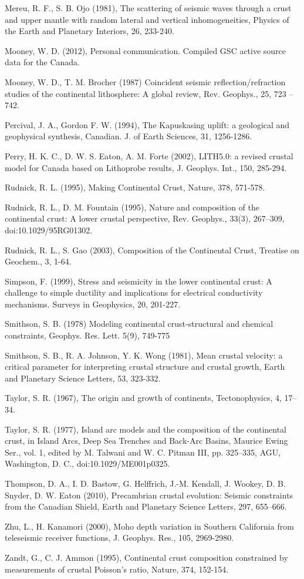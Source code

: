 \documentclass[draft, 12pt]{article}
\begin{document}
Mereu, R. F., S. B. Ojo (1981), The scattering of seismic waves through a crust and upper mantle with random lateral and vertical inhomogeneities, Physics of the Earth and Planetary Interiors, 26, 233-240.

Mooney, W. D. (2012), Personal communication. Compiled GSC active source data for the Canada.

Mooney, W. D., T. M. Brocher (1987) Coincident seismic reflection/refraction studies of the continental lithosphere: A global review, Rev. Geophys., 25, 723 – 742.

Percival, J. A., Gordon F. W. (1994), The Kapuskasing uplift: a geological and geophysical synthesis, Canadian. J. of Earth Sciences, 31, 1256-1286.

Perry, H. K. C., D. W. S. Eaton, A. M. Forte (2002), LITH5.0: a revised crustal model for Canada based on Lithoprobe results,  J. Geophys. Int., 150, 285-294.

Rudnick, R. L. (1995), Making Continental Crust, Nature, 378, 571-578.

Rudnick, R. L., D. M. Fountain (1995), Nature and composition of the continental crust: A lower crustal perspective, Rev. Geophys., 33(3), 267–309, doi:10.1029/95RG01302.

Rudnick, R. L., S. Gao (2003), Composition of the Continental Crust, Treatise on Geochem., 3, 1-64.

Simpson, F. (1999), Stress and seismicity in the lower continental crust: A challenge to simple ductility and implications for electrical conductivity mechanisms. Surveys in Geophysics, 20, 201-227.

Smithson, S. B. (1978) Modeling continental crust-structural and chemical constraints, Geophys. Res. Lett. 5(9), 749-775

Smithson, S. B., R. A. Johnson, Y. K. Wong (1981), Mean crustal velocity: a critical parameter for interpreting crustal structure and crustal growth, Earth and Planetary Science Letters, 53, 323-332.

Taylor, S. R. (1967), The origin and growth of continents, Tectonophysics, 4, 17–34.

Taylor, S. R. (1977), Island arc models and the composition of the continental crust, in Island Arcs, Deep Sea Trenches and Back-Arc Basins, Maurice Ewing Ser., vol. 1, edited by M. Talwani and W. C. Pitman III, pp. 325–335, AGU, Washington, D. C., doi:10.1029/ME001p0325.

Thompson, D. A., I. D. Bastow, G. Helffrich, J.-M. Kendall, J. Wookey, D. B. Snyder, D. W. Eaton (2010), Precambrian crustal evolution: Seismic constraints from the Canadian Shield, Earth and Planetary Science Letters, 297, 655–666.

Zhu, L., H. Kanamori (2000), Moho depth variation in Southern California from teleseismic receiver functions, J. Geophys. Res., 105, 2969-2980.

Zandt, G., C. J. Ammon (1995), Continental crust composition constrained by measurements of crustal Poisson's ratio, Nature, 374, 152-154.
\end{document}

